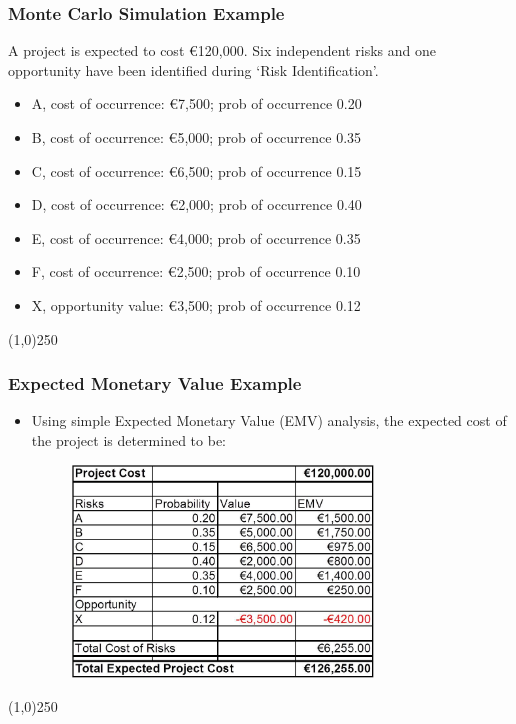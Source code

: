 \begin{frame}
\frametitle{Monte Carlo Simulation Example}
	A project is expected to cost \euro120,000.  Six independent risks and one opportunity have been identified during `Risk Identification'.
\begin{itemize}
\item A, cost of occurrence: \euro7,500; prob of occurrence 0.20  
\item B, cost of occurrence: \euro5,000; prob of occurrence 0.35 
\item C, cost of occurrence: \euro6,500; prob of occurrence 0.15 
\item D, cost of occurrence: \euro2,000; prob of occurrence 0.40 
\item E, cost of occurrence: \euro4,000; prob of occurrence 0.35
\item F, cost of occurrence: \euro2,500; prob of occurrence 0.10 
\item X, opportunity value: \euro3,500; prob of occurrence 0.12 
\end{itemize}
\end{frame}\begin{center}\line(1,0){250}\end{center}


\begin{frame}
\frametitle{Expected Monetary Value Example}
\begin{itemize}
\item Using simple Expected Monetary Value (EMV) analysis, the expected cost of the project is determined to be: 
\begin{figure}
	\centering
		\includegraphics[width = 8cm]{images/evm1.jpg}
	\label{fig:evm}
\end{figure}
\end{itemize}
\end{frame}\begin{center}\line(1,0){250}\end{center}



